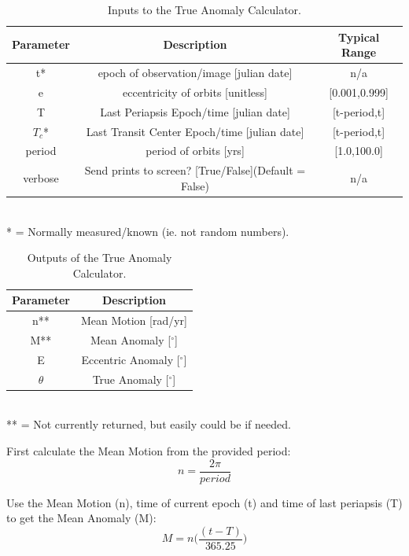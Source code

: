 \documentclass[12pt,preprint]{aastex}
\begin{document}
\begin{table}[h]
\centering
\caption{ Inputs to the True Anomaly Calculator.}
\begin{tabular}{c c c}
\hline\hline
Parameter & Description & Typical Range \\
\hline
t* & epoch of observation/image [julian date] & n/a\\
e & eccentricity of orbits [unitless] & [0.001,0.999]\\
T & Last Periapsis Epoch/time [julian date] & [t-period,t]\\
$T_c$* & Last Transit Center Epoch/time [julian date] & [t-period,t]\\
period & period of orbits [yrs] & [1.0,100.0]\\
verbose & Send prints to screen? [True/False](Default = False) & n/a\\
\hline
\end{tabular}
\\
 * = Normally measured/known (ie. not random numbers).
\end{table}


\begin{table}[h]
\centering
\caption{ Outputs of the True Anomaly Calculator.}
\begin{tabular}{c c}
\hline\hline
Parameter & Description \\
\hline
n** & Mean Motion [rad/yr] \\
M** & Mean Anomaly [$^{\circ}$]\\
E & Eccentric Anomaly [$^{\circ}$]\\
$\theta$ & True Anomaly [$^{\circ}$]\\
\hline
\end{tabular}
\\
 ** = Not currently returned, but easily could be if needed.
\end{table}
\pagebreak

First calculate the Mean Motion from the provided period:
\begin{equation}\label{eq:4.1.1}
n = \frac{2\pi}{period} 
\end{equation}

Use the Mean Motion (n), time of current epoch (t) and time of last periapsis (T) to get the Mean Anomaly (M):
\begin{equation}\label{eq:4.1.2}
M = n \bigg( \frac{(t-T)}{365.25} \bigg)
\end{equation}
\end{document}

